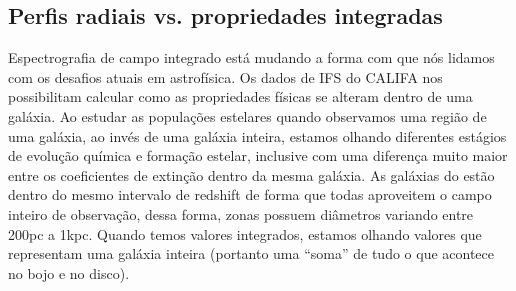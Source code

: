 \subsection{Perfis radiais vs. propriedades integradas}
\label{sec:difextin:nextsteps:SDSSvsCALIFA}

Espectrografia de campo integrado está mudando a forma com que nós lidamos com os desafios atuais em
astrofísica. Os dados de IFS do CALIFA nos possibilitam calcular como as propriedades físicas se
alteram dentro de uma galáxia. Ao estudar as populações estelares quando observamos uma região de
uma galáxia, ao invés de uma galáxia inteira, estamos olhando diferentes estágios de evolução
química e formação estelar, inclusive com uma diferença muito maior entre os coeficientes de
extinção dentro da mesma galáxia. As galáxias do \CAL estão dentro do mesmo intervalo de redshift de
forma que todas aproveitem o campo inteiro de observação, dessa forma, zonas possuem diâmetros
variando entre 200pc a 1kpc. Quando temos valores integrados, estamos olhando valores que
representam uma galáxia inteira (portanto uma ``soma'' de tudo o que acontece no bojo e no disco).



